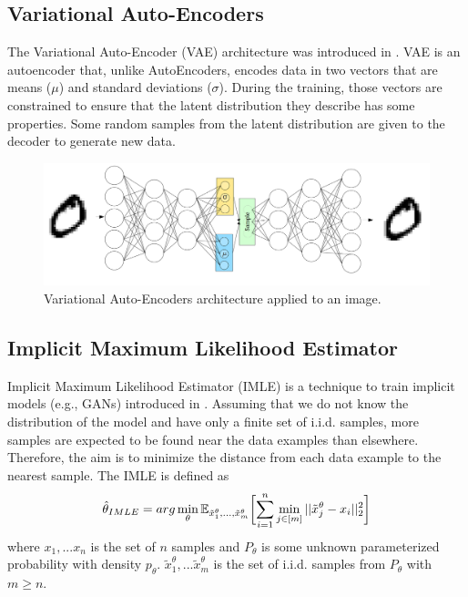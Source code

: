 \documentclass{article}
\begin{document}
\subsection{Variational Auto-Encoders}
The Variational Auto-Encoder (VAE) architecture was introduced in \cite{vae}. VAE is an autoencoder that, unlike AutoEncoders, encodes data in two vectors that are means ($\mu$) and standard deviations ($\sigma$). During the training, those vectors are constrained to ensure that the latent distribution they describe has some properties. Some random samples from the latent distribution are given to the decoder to generate new data.

\begin{figure}[h]
    \centering
    \includegraphics[scale=.3]{vae.png}
    \caption{Variational Auto-Encoders architecture applied to an image.}
    \label{img:vae}
\end{figure}



\subsection{Implicit Maximum Likelihood Estimator}
Implicit Maximum Likelihood Estimator (IMLE) is a technique to train implicit models (e.g., GANs) introduced in \cite{imle}. Assuming that we do not know the distribution of the model and have only a finite set of i.i.d. samples, more samples are expected to be found near the data examples than elsewhere. Therefore, the aim is to minimize the distance from each data example to the nearest sample. The IMLE is defined as
\begin{equation}
    \hat{\theta}_{IMLE} = \normalfont{arg} \min_{\theta} \mathbb{E}_{\tilde{x}_1^{\theta}, ..., \tilde{x}_m^{\theta}} \biggl[ \sum^n _{i=1} \min_{j \in [m]} ||\tilde{x}_j^{\theta}-x_i||_2^2\biggr]
\end{equation}
where $x_1, ... x_n$ is the set of $n$ samples and $P_\theta$ is some unknown parameterized probability with density $p_\theta$. $\tilde{x}_1^\theta, ... \tilde{x}^\theta_m$ is the set of i.i.d. samples from $P_\theta$ with $m \geq n$.
\end{document}
